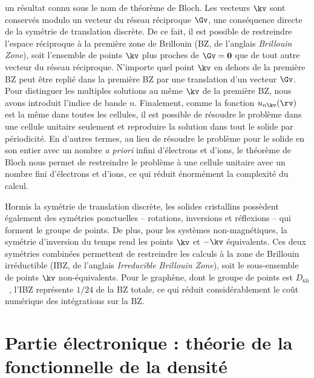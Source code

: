 un résultat connu sous le nom de théorème de Bloch. Les vecteurs $\kv$ sont conservés modulo un vecteur du réseau réciproque $\Gv$, une conséquence directe de la symétrie de translation discrète. De ce fait, il est possible de restreindre l'espace réciproque à la première zone de Brillouin (BZ, de l'anglais \textit{Brillouin Zone}), soit l'ensemble de points $\kv$ plus proches de $\Gv=\mathbf{0}$ que de tout autre vecteur du réseau réciproque. N'importe quel point $\kv$ en dehors de la première BZ peut être replié dans la première BZ par une translation d'un vecteur $\Gv$. Pour distinguer les multiples solutions au même $\kv$ de la première BZ, nous avons introduit l'indice de bande $n$. Finalement, comme la fonction $u_{n\kv}(\rv)$ est la même dans toutes les cellules, il est possible de résoudre le problème dans une cellule unitaire seulement et reproduire la solution dans tout le solide par périodicité. En d'autres termes, au lieu de résoudre le problème pour le solide en son entier avec un nombre \textit{a priori} infini d'électrons et d'ions, le théorème de Bloch nous permet de restreindre le problème à une cellule unitaire avec un nombre fini d'électrons et d'ions, ce qui réduit énormément la complexité du calcul. 

Hormis la symétrie de translation discrète, les solides cristallins possèdent également des symétries ponctuelles -- rotations, inversions et réflexions -- qui forment le groupe de points. De plus, pour les systèmes non-magnétiques, la symétrie d'inversion du temps rend les points $\kv$ et $-\kv$ équivalents. Ces deux symétries combinées permettent de restreindre les calculs à la zone de Brillouin irréductible (IBZ, de l'anglais \textit{Irreducible Brillouin Zone}), soit le sous-ensemble de points $\kv$ non-équivalents. Pour le graphène, dont le groupe de points est $D_{6h}$~\cite{dresselhausPhysicalPropertiesCarbon1998,castronetoElectronicPropertiesGraphene2009}, l'IBZ représente $1/24$ de la BZ totale, ce qui réduit considérablement le coût numérique des intégrations sur la BZ.

\section{Partie électronique : théorie de la fonctionnelle de la densité}\label{sec:électrons}

